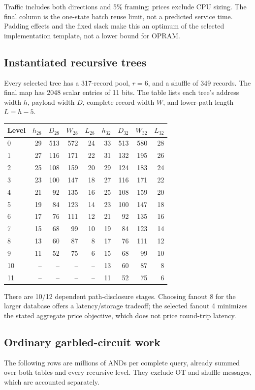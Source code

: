 \documentclass[11pt]{article}
\begin{document}
Traffic includes both directions and 5\% framing;
prices exclude CPU sizing. The final column is the one-state batch reuse
limit, not a predicted service time. Padding effects and the fixed slack
make this an optimum of the selected implementation template, not a lower
bound for OPRAM.

\subsection{Instantiated recursive trees}
Every selected tree has a 317-record pool, $r=6$, and a shuffle of 349
records. The final map has 2048 scalar entries of 11 bits. The table lists
each tree's address width $h$, payload width $D$, complete record width $W$,
and lower-path length $L=h-5$.

\begin{center}\small
\begin{tabular}{lrrrrrrrr}\toprule
Level & $h_{28}$ & $D_{28}$ & $W_{28}$ & $L_{28}$ & $h_{32}$ & $D_{32}$ & $W_{32}$ & $L_{32}$\\\midrule
0 & 29 & 513 & 572 & 24 & 33 & 513 & 580 & 28\\
1 & 27 & 116 & 171 & 22 & 31 & 132 & 195 & 26\\
2 & 25 & 108 & 159 & 20 & 29 & 124 & 183 & 24\\
3 & 23 & 100 & 147 & 18 & 27 & 116 & 171 & 22\\
4 & 21 & 92 & 135 & 16 & 25 & 108 & 159 & 20\\
5 & 19 & 84 & 123 & 14 & 23 & 100 & 147 & 18\\
6 & 17 & 76 & 111 & 12 & 21 & 92 & 135 & 16\\
7 & 15 & 68 & 99 & 10 & 19 & 84 & 123 & 14\\
8 & 13 & 60 & 87 & 8 & 17 & 76 & 111 & 12\\
9 & 11 & 52 & 75 & 6 & 15 & 68 & 99 & 10\\
10 & -- & -- & -- & -- & 13 & 60 & 87 & 8\\
11 & -- & -- & -- & -- & 11 & 52 & 75 & 6\\
\bottomrule\end{tabular}
\end{center}

There are 10/12 dependent path-disclosure stages.
Choosing fanout 8 for the larger database offers a latency/storage tradeoff;
the selected fanout 4 minimizes the stated aggregate price objective, which
does not price round-trip latency.

\subsection{Ordinary garbled-circuit work}
The following rows are millions of ANDs per complete query, already summed
over both tables and every recursive level. They exclude OT and shuffle
messages, which are accounted separately.
\end{document}
